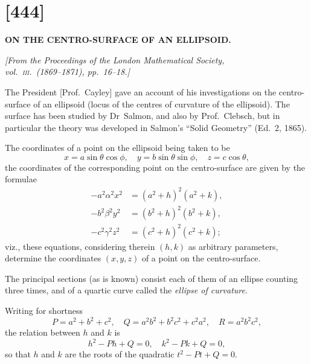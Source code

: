 \documentclass[11pt,a4paper]{article}
\begin{document}
\newpage
\section*{[444]}

\begin{center}
\textbf{\Large ON THE CENTRO-SURFACE OF AN ELLIPSOID.}
\end{center}

\begin{flushright}
\textit{[From the \textit{Proceedings of the London Mathematical Society},}\\
\textit{vol.\ \textsc{iii}.\ (1869--1871), pp.\ 16--18.]}
\end{flushright}

\vspace{1em}

\noindent
The President [Prof.~Cayley] gave an account of his investigations on the centro-surface of an ellipsoid (locus of the centres of curvature of the ellipsoid). The surface has been studied by Dr~Salmon, and also by Prof.~Clebsch, but in particular the theory was developed in Salmon's ``Solid Geometry'' (Ed.\ 2, 1865).

The coordinates of a point on the ellipsoid being taken to be
\[
x = a\sin\theta\cos\phi,\quad y = b\sin\theta\sin\phi,\quad z = c\cos\theta,
\]
the coordinates of the corresponding point on the centro-surface are given by the formulae
\begin{align*}
-a^2\alpha^2 x^2 &= (a^2 + h)^2 (a^2 + k), \\
-b^2\beta^2 y^2 &= (b^2 + h)^2 (b^2 + k), \\
-c^2\gamma^2 z^2 &= (c^2 + h)^2 (c^2 + k);
\end{align*}
viz., these equations, considering therein $(h, k)$ as arbitrary parameters, determine the coordinates $(x, y, z)$ of a point on the centro-surface.

The principal sections (as is known) consist each of them of an ellipse counting three times, and of a quartic curve called the \textit{ellipse of curvature}.

Writing for shortness
\[
P = a^2 + b^2 + c^2,\quad Q = a^2b^2 + b^2c^2 + c^2a^2,\quad R = a^2b^2c^2,
\]
the relation between $h$ and $k$ is
\[
h^2 - Ph + Q = 0,\quad k^2 - Pk + Q = 0,
\]
so that $h$ and $k$ are the roots of the quadratic $t^2 - Pt + Q = 0$.
\end{document}
